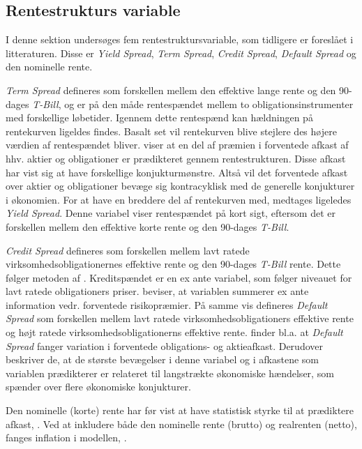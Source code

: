 \documentclass[
  a4paper,
  oneside]{memoir}
\begin{document}
\hypertarget{rentestrukturs-variable}{%
\subsection{Rentestrukturs variable}\label{rentestrukturs-variable}}

I denne sektion undersøges fem rentestruktursvariable, som tidligere er foreslået i litteraturen. Disse er \emph{Yield Spread}, \emph{Term Spread}, \emph{Credit Spread}, \emph{Default Spread} og den nominelle rente.

\emph{Term Spread} defineres som forskellen mellem den effektive lange rente og den 90-dages \emph{T-Bill}, og er på den måde rentespændet mellem to obligationsinstrumenter med forskellige løbetider. Igennem dette rentespænd kan hældningen på rentekurven ligeldes findes. Basalt set vil rentekurven blive stejlere des højere værdien af rentespændet bliver. \citep{Fama1989} viser at en del af præmien i forventede afkast af hhv. aktier og obligationer er prædikteret gennem rentestrukturen. Disse afkast har vist sig at have forskellige konjukturmønstre. Altså vil det forventede afkast over aktier og obligationer bevæge sig kontracyklisk med de generelle konjukturer i økonomien. For at have en breddere del af rentekurven med, medtages ligeledes \emph{Yield Spread}. Denne variabel viser rentespændet på kort sigt, eftersom det er forskellen mellem den effektive korte rente og den 90-dages \emph{T-Bill}.

\emph{Credit Spread} defineres som forskellen mellem lavt ratede virksomhedsobligationernes effektive rente og den 90-dages \emph{T-Bill} rente. Dette følger metoden af \citep{Keim1986}. Kreditspændet er en ex ante variabel, som følger niveauet for lavt ratede obligationers priser. \citep{Keim1986} beviser, at variablen summerer ex ante information vedr. forventede risikopræmier. På samme vis defineres \emph{Default Spread} som forskellen mellem lavt ratede virksomhedsobligationers effektive rente og højt ratede virksomhedsobligationerns effektive rente. \citep{Fama1989} finder bl.a. at \emph{Default Spread} fanger variation i forventede obligations- og aktieafkast. Derudover beskriver de, at de største bevægelser i denne variabel og i afkastene som variablen prædikterer er relateret til langstrækte økonomiske hændelser, som spænder over flere økonomiske konjukturer.

Den nominelle (korte) rente har før vist at have statistisk styrke til at prædiktere afkast, \citep{Campbell2005}. Ved at inkludere både den nominelle rente (brutto) og realrenten (netto), fanges inflation i modellen, \citep{Campbell2005}.
\end{document}
